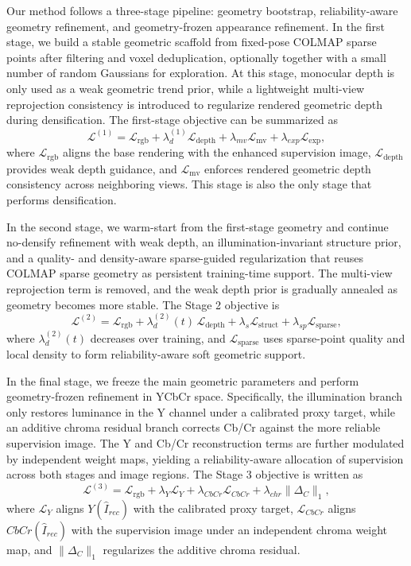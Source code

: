 Our method follows a three-stage pipeline: geometry bootstrap, reliability-aware
geometry refinement, and geometry-frozen appearance refinement. In the first
stage, we build a stable geometric scaffold from fixed-pose COLMAP sparse
points after filtering and voxel deduplication, optionally together with a
small number of random Gaussians for exploration. At this stage, monocular
depth is only used as a weak geometric trend prior, while a lightweight
multi-view reprojection consistency is introduced to regularize rendered
geometric depth during densification. The first-stage objective can be summarized as
\begin{equation}
\mathcal{L}^{(1)}
= \mathcal{L}_{\mathrm{rgb}}
+ \lambda_d^{(1)} \mathcal{L}_{\mathrm{depth}}
+ \lambda_{mv} \mathcal{L}_{\mathrm{mv}}
+ \lambda_{exp} \mathcal{L}_{\mathrm{exp}},
\end{equation}
where $\mathcal{L}_{\mathrm{rgb}}$ aligns the base rendering with the enhanced
supervision image, $\mathcal{L}_{\mathrm{depth}}$ provides weak depth guidance,
and $\mathcal{L}_{\mathrm{mv}}$ enforces rendered geometric depth consistency
across neighboring views. This stage is also the only stage that performs densification. 

In the second stage, we warm-start from the first-stage geometry and continue
no-densify refinement with weak depth, an illumination-invariant structure prior,
and a quality- and density-aware sparse-guided regularization that reuses COLMAP
sparse geometry as persistent training-time support. The multi-view reprojection
term is removed, and the weak depth prior is gradually annealed as geometry becomes
more stable. The Stage 2 objective is
\begin{equation}
\mathcal{L}^{(2)}
= \mathcal{L}_{\mathrm{rgb}}
+ \lambda_d^{(2)}(t)\,\mathcal{L}_{\mathrm{depth}}
+ \lambda_s \mathcal{L}_{\mathrm{struct}}
+ \lambda_{sp} \mathcal{L}_{\mathrm{sparse}},
\end{equation}
where $\lambda_d^{(2)}(t)$ decreases over training, and $\mathcal{L}_{\mathrm{sparse}}$
uses sparse-point quality and local density to form reliability-aware soft geometric support. 

In the final stage, we freeze the main geometric parameters and perform geometry-frozen
refinement in YCbCr space. Specifically, the illumination branch only restores
luminance in the Y channel under a calibrated proxy target, while an additive chroma
residual branch corrects Cb/Cr against the more reliable supervision image. The Y and
Cb/Cr reconstruction terms are further modulated by independent weight maps, yielding
a reliability-aware allocation of supervision across both stages and image regions.
The Stage 3 objective is written as
\begin{equation}
\mathcal{L}^{(3)}
= \mathcal{L}_{\mathrm{rgb}}
+ \lambda_Y \mathcal{L}_{Y}
+ \lambda_{CbCr} \mathcal{L}_{CbCr}
+ \lambda_{chr} \|\Delta_C\|_1,
\end{equation}
where $\mathcal{L}_{Y}$ aligns $Y(\hat{I}_{rec})$ with the calibrated proxy target,
$\mathcal{L}_{CbCr}$ aligns $CbCr(\hat{I}_{rec})$ with the supervision image
under an independent chroma weight map, and $\|\Delta_C\|_1$
regularizes the additive chroma residual. 

